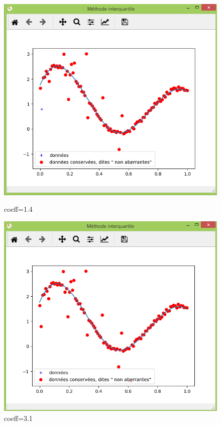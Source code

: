 \documentclass[11pt]{report}
\begin{document}
\begin{figure}[!htb]
%
  \includegraphics[width=\linewidth]{quap.png}
  \caption{coeff=1.4}\label{fig:awesome_image3}
\endminipage
{}%
  \includegraphics[width=\linewidth]{quas.png}
  \caption{coeff=3.1}\label{fig:awesome_image3}
\endminipage
\end{figure}
\end{document}
